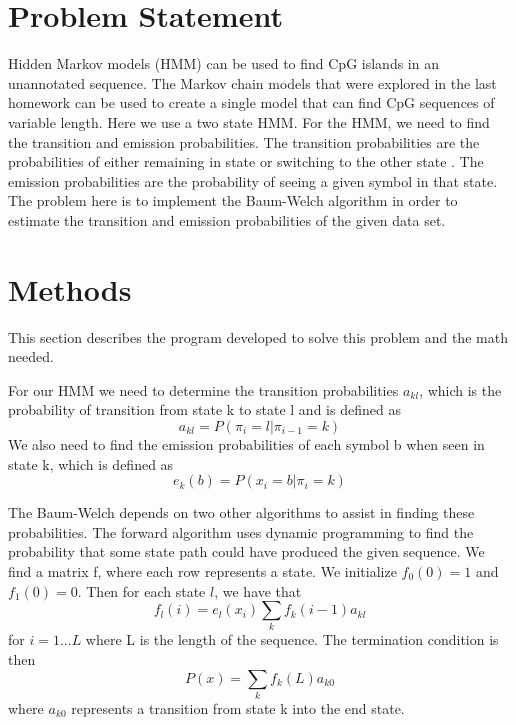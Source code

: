 \documentclass{acm_proc_article-sp}
\begin{document}
\section{Problem Statement}
Hidden Markov models (HMM) can be used to find CpG islands in an unannotated sequence.  The Markov chain models that were explored in the last homework can be used to create a single model that can find CpG sequences of variable length.  Here we use a two state HMM.  For the HMM, we need to find the transition and emission probabilities.  The transition probabilities are the probabilities of either remaining in state or switching to the other state .  The emission probabilities are the probability of seeing a given symbol in that state.  The problem here is to implement the Baum-Welch algorithm in order to estimate the transition and emission probabilities of the given data set.  

\section{Methods}
This section describes the program developed to solve this problem and the math needed.

For our HMM we need to determine the transition probabilities $a_{kl}$, which is the probability of transition from state k to state l and is defined as
\begin{equation}a_{kl} = P(\pi_{i} = l |\pi_{i-1} = k)\end{equation}
We also need to find the emission probabilities of each symbol b when seen in state k, which is defined as
\begin{equation}e_{k}(b) = P(x_{i} = b | \pi_{i} = k)\end{equation}

The Baum-Welch depends on two other algorithms to assist in finding these probabilities.  The forward algorithm uses dynamic programming to find the probability that some state path could have produced the given sequence.  We find a matrix f, where each row represents a state.  We initialize $f_{0}(0) = 1$ and $f_{1}(0) = 0$.  Then for each state $l$, we have that
\begin{equation}f_{l}(i) = e_{l}(x_{i})\sum_{k}f_{k}(i-1)a_{kl}\end{equation}
for $i=1...L$ where L is the length of the sequence.  The termination condition is then
\begin{equation}P(x) = \sum_{k}f_{k}(L)a_{k0}\end{equation}
where $a_{k0}$ represents a transition from state k into the end state.  
\end{document}
